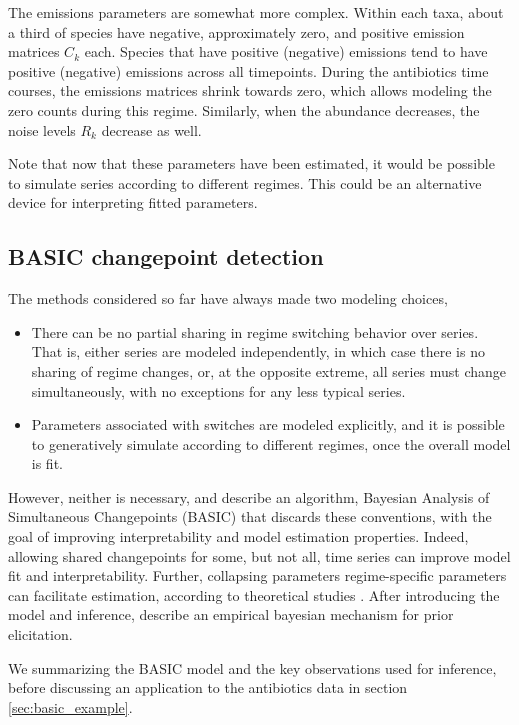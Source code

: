 \documentclass[14pt]{extreport}
\begin{document}
The emissions parameters are somewhat more complex. Within each taxa, about a
third of species have negative, approximately zero, and positive emission
matrices $C_{k}$ each. Species that have positive (negative) emissions tend to
have positive (negative) emissions across all timepoints. During the antibiotics
time courses, the emissions matrices shrink towards zero, which allows modeling
the zero counts during this regime. Similarly, when the abundance decreases, the
noise levels $R_k$ decrease as well.

Note that now that these parameters have been estimated, it would be possible to
simulate series according to different regimes. This could be an alternative
device for interpreting fitted parameters.

\subsection{BASIC changepoint detection}

The methods considered so far have always made two modeling choices,
\begin{itemize}
\item There can be no partial sharing in regime switching behavior over series.
  That is, either series are modeled independently, in which case there is no
  sharing of regime changes, or, at the opposite extreme, all series must change
  simultaneously, with no exceptions for any less typical series.
\item Parameters associated with switches are modeled explicitly, and it is
  possible to generatively simulate according to different regimes, once the
  overall model is fit.
\end{itemize}

However, neither is necessary, and \cite{fan2015empirical} describe an
algorithm, Bayesian Analysis of Simultaneous Changepoints (BASIC) that discards
these conventions, with the goal of improving interpretability and model
estimation properties. Indeed, allowing shared changepoints for some, but not
all, time series can improve model fit and interpretability. Further, collapsing
parameters regime-specific parameters can facilitate estimation, according to
theoretical studies \citep{liu1994collapsed}. After introducing the model and
inference, \cite{fan2015empirical} describe an empirical bayesian mechanism for
prior elicitation.

We summarizing the BASIC model and the key observations used for inference,
before discussing an application to the antibiotics data in section
\ref{sec:basic_example}.
\end{document}
